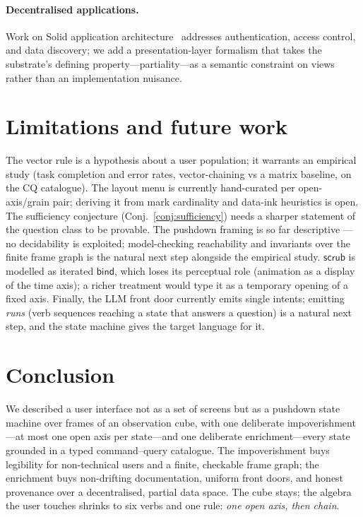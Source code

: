 \documentclass[11pt,a4paper]{article}
\theoremstyle{remark}
\newcommand{\vbind}{\mathsf{bind}}
\newcommand{\vscrub}{\mathsf{scrub}}
\begin{document}
\paragraph{Decentralised applications.} Work on Solid application
architecture~\cite{solid} addresses authentication, access control, and data
discovery; we add a presentation-layer formalism that takes the substrate's
defining property---partiality---as a semantic constraint on views rather than an
implementation nuisance.

\section{Limitations and future work}\label{sec:limits}

The vector rule is a hypothesis about a user population; it warrants an empirical
study (task completion and error rates, vector-chaining vs a matrix baseline, on
the CQ catalogue). The layout menu is currently hand-curated per open-axis/grain
pair; deriving it from mark cardinality and data-ink heuristics is open. The
sufficiency conjecture (Conj.~\ref{conj:sufficiency}) needs a sharper statement of
the question class to be provable. The pushdown framing is so far descriptive
--- no decidability is exploited; model-checking reachability and invariants
over the finite frame graph is the natural next step alongside the empirical
study. $\vscrub$ is modelled as iterated $\vbind$,
which loses its perceptual role (animation as a display of the time axis); a
richer treatment would type it as a temporary opening of a fixed axis. Finally,
the LLM front door currently emits single intents; emitting \emph{runs} (verb
sequences reaching a state that answers a question) is a natural next step, and
the state machine gives the target language for it.

\section{Conclusion}

We described a user interface not as a set of screens but as a pushdown state
machine over frames of an observation cube, with one deliberate
impoverishment---at most one open axis per state---and one deliberate
enrichment---every state grounded in a typed command--query catalogue. The
impoverishment buys legibility for non-technical users and a finite, checkable
frame graph; the enrichment buys non-drifting documentation, uniform front doors,
and honest provenance over a decentralised, partial data space. The cube stays;
the algebra the user touches shrinks to six verbs and one rule: \emph{one open
axis, then chain}.
\end{document}
